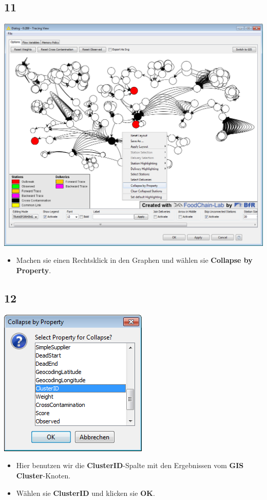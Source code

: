 \documentclass{beamer}
\begin{document}
\subsection{11}
\begin{frame}
	\begin{center}
  		\includegraphics[height=0.6\textheight]{11.png}
	\end{center}
	\begin{itemize}
		\item Machen sie einen Rechtsklick in den Graphen und wählen sie \textbf{Collapse by Property}.
	\end{itemize}
\end{frame}

\subsection{12}
\begin{frame}
	\begin{center}
  		\includegraphics[height=0.5\textheight]{12.png}
	\end{center}
	\begin{itemize}
		\item Hier benutzen wir die \textbf{ClusterID}-Spalte mit den Ergebnissen vom \textbf{GIS Cluster}-Knoten.
		\item Wählen sie \textbf{ClusterID} und klicken sie \textbf{OK}.
	\end{itemize}
\end{frame}
\end{document}
